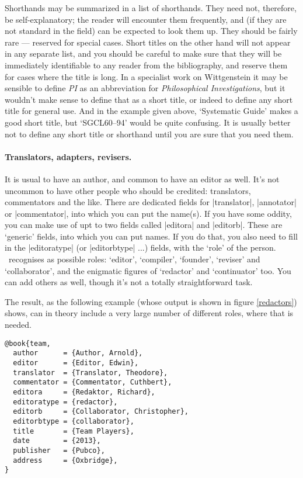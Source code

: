 Shorthands may be summarized in a list of shorthands. They need not,
therefore, be self-explanatory; the reader will encounter them
frequently, and (if they are not standard in the field) can be
expected to look them up. They should be fairly rare --- reserved for
special cases. Short titles on the other hand will not appear in any
separate list, and you should be careful to make sure that they will
be immediately identifiable to any reader from the bibliography, and
reserve them for cases where the title is long. In a specialist work
on Wittgenstein it may be sensible to define \emph{PI} as an
abbreviation for \emph{Philosophical Investigations}, but it wouldn't
make sense to define that as a short title, or indeed to define any
short title for general use. And in the example given above,
`Systematic Guide' makes a good short title, but `SGCL60--94' would be
quite confusing. It is usually better not to define any short title or
shorthand until you are sure that you need them.

\paragraph{Translators, adapters, revisers.} It is usual to have an
author, and common to have an editor as well. It's not uncommon to
have other people who should be credited: translators, commentators
and the like. There are dedicated fields for |translator|, |annotator|
or |commentator|, into which you can put the name(s). If you have some
oddity, you can make use of upt to two fields called |editora| and
|editorb|. These are `generic' fields, into which you can put
names. If you do that, you also need to fill in the |editoratype| (or
|editorbtype| ...) fields, with the `role' of the person. \biblatex\
recognises as possible roles: `editor', `compiler', `founder',
`reviser' and `collaborator', and the enigmatic figures of `redactor'
and `continuator' too. You can add others as well, though it's not a
totally straightforward task.\intref{See \emph{Manual} \S\S~2.3.6, 3.8
  and 4.9.1.}

The result, as the following example (whose output is shown in figure
\ref{redactors}) shows, can in theory include a very large number of
different roles, where that is needed.
\begin{Verbatim}
@book{team,
  author      = {Author, Arnold},
  editor      = {Editor, Edwin},
  translator  = {Translator, Theodore},
  commentator = {Commentator, Cuthbert},
  editora     = {Redaktor, Richard},
  editoratype = {redactor},
  editorb     = {Collaborator, Christopher},
  editorbtype = {collaborator},
  title       = {Team Players},
  date        = {2013},
  publisher   = {Pubco},
  address     = {Oxbridge},
}
\end{Verbatim}

